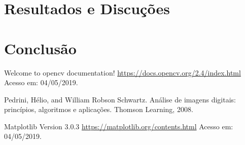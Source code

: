 \documentclass[twoside,twocolumn]{article}
\begin{document}
\section{Resultados e Discuções}




\section{Conclusão}




\begin{thebibliography}{99} %

 Welcome to opencv documentation! \href{https://docs.opencv.org/2.4/index.html}{https://docs.opencv.org/2.4/index.html} Acesso em: 04/05/2019.

 Pedrini, Hélio, and William Robson Schwartz. Análise de imagens digitais: princípios, algoritmos e aplicações. Thomson Learning, 2008.

 Matplotlib Version 3.0.3 \href{https://matplotlib.org/contents.html}{https://matplotlib.org/contents.html} Acesso em: 04/05/2019.
 
\end{thebibliography}

\end{document}
